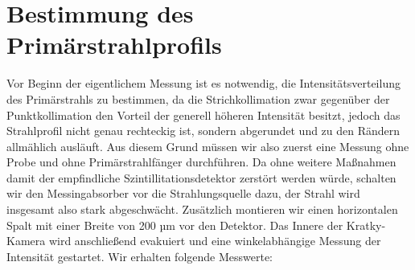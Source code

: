 \documentclass[bigchapter,colorback,accentcolor=tud4b,linedtoc,11pt]{tudreport}
\begin{document}
\section{Bestimmung des Primärstrahlprofils}

Vor Beginn der eigentlichem Messung ist es notwendig, die Intensitätsverteilung des Primärstrahls zu bestimmen, da die Strichkollimation zwar gegenüber der Punktkollimation den Vorteil der generell höheren Intensität besitzt, jedoch das Strahlprofil nicht genau rechteckig ist, sondern abgerundet und zu den Rändern allmählich ausläuft. Aus diesem Grund müssen wir also zuerst eine Messung ohne Probe und ohne Primärstrahlfänger durchführen. Da ohne weitere Maßnahmen damit der empfindliche Szintillitationsdetektor zerstört werden würde, schalten wir den Messingabsorber vor die Strahlungsquelle dazu, der Strahl wird insgesamt also stark abgeschwächt. Zusätzlich montieren wir einen horizontalen Spalt mit einer Breite von 200 µm vor den Detektor. Das Innere der Kratky-Kamera wird anschließend evakuiert und eine winkelabhängige Messung der Intensität gestartet. Wir erhalten folgende Messwerte:
\end{document}
